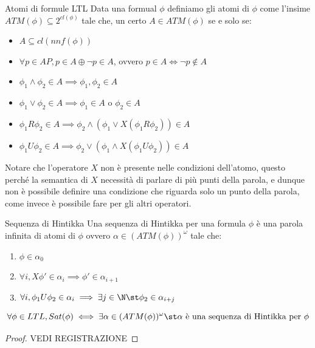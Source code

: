 \begin{definition}{Atomi di formule LTL}
  Data una formual \(\phi\) definiamo gli atomi di \(\phi\) come l'insime \(ATM(\phi)\subseteq 2^{cl(\phi)}\) tale che, un certo \(A \in ATM(\phi)\) se e solo se:
  \begin{itemize}
    \item \(A\subseteq cl(nnf(\phi))\)
    \item \(\forall p \in AP, p\in A \oplus  \neg p \in A\), ovvero \(p\in A\iff \neg p \notin A\)
    \item \(\phi_1 \land \phi_2 \in A \implies \phi_1, \phi_2 \in A\)
    \item \(\phi_1 \lor \phi_2 \in A \implies \phi_1 \in A \text{ o } \phi_2 \in A\)
    \item \(\phi_1 R \phi_2 \in A \implies \phi_2 \land (\phi_1 \lor X(\phi_1 R \phi_2)) \in A\)
    \item \(\phi_1 U \phi_2 \in A \implies \phi_2 \lor (\phi_1 \land X(\phi_1 U \phi_2)) \in A\)
  \end{itemize}
\end{definition}

Notare che l'operatore \(X\) non è presente nelle condizioni dell'atomo, questo perché la semantica di \(X\) necessità di parlare di più punti della parola, e dunque non è possibile definire una condizione che riguarda solo un punto della parola, come invece è possibile fare per gli altri operatori.

\begin{definition}{Sequenza di Hintikka}
  Una sequenza di Hintikka per una formula \(\phi\) è una parola infinita di atomi di \(\phi\) ovvero \(\alpha \in (ATM(\phi))^\omega\) tale che:
  \begin{enumerate}
    \item \(\phi \in \alpha_0\)
    \item \(\forall i, X\phi' \in \alpha_i \implies \phi' \in \alpha_{i+1}\)
    \item \(\forall i, \phi_1U\phi_2 \in \alpha_i \implies \exists j \in \N\st\phi_2\in\alpha_{i+j}\)
  \end{enumerate}
\end{definition}

\begin{theorem}{}
  \[\forall \phi \in LTL, Sat(\phi) \iff \exists \alpha \in (ATM(\phi))^\omega\st\alpha \text{ è una sequenza di Hintikka per } \phi\]
\end{theorem}
\begin{proof}
  VEDI REGISTRAZIONE
\end{proof}

